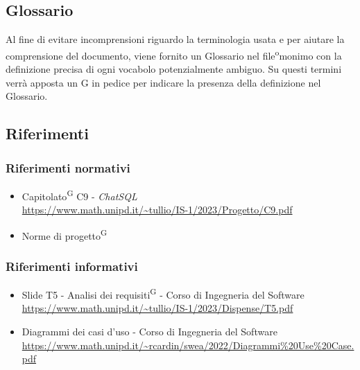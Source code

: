\subsection{Glossario}
Al fine di evitare incomprensioni riguardo la terminologia usata e per aiutare la comprensione del documento, viene fornito un Glossario nel file\textsuperscript omonimo con la definizione precisa di ogni vocabolo potenzialmente ambiguo. Su questi termini verrà apposta un G in pedice per indicare la presenza della definizione nel Glossario.

\subsection{Riferimenti}
\subsubsection{Riferimenti normativi}
\begin{itemize}
	\item Capitolato\textsuperscript{G} C9 - \textit{ChatSQL} \\ \url{https://www.math.unipd.it/~tullio/IS-1/2023/Progetto/C9.pdf}
	\item Norme di progetto\textsuperscript{G}
\end{itemize}

\subsubsection{Riferimenti informativi}
\begin{itemize}
	\item Slide T5 - Analisi dei requisiti\textsuperscript{G} - Corso di Ingegneria del Software \\ \url{https://www.math.unipd.it/~tullio/IS-1/2023/Dispense/T5.pdf}
	\item Diagrammi dei casi d'uso - Corso di Ingegneria del Software \\ \url{https://www.math.unipd.it/~rcardin/swea/2022/Diagrammi%20Use%20Case.pdf}
\end{itemize}